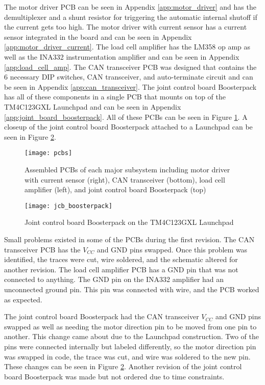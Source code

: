\noindent The motor driver PCB can be seen in Appendix \ref{app:motor_driver} and has the demultiplexer and a shunt resistor for triggering the automatic internal shutoff if the current gets too high. The motor driver with current sensor has a current sensor integrated in the board and can be seen in Appendix \ref{app:motor_driver_current}. The load cell amplifier has the LM358 op amp as well as the INA332 instrumentation amplifier and can be seen in Appendix \ref{app:load_cell_amp}. The CAN transceiver PCB was designed that contains the 6 necessary DIP switches, CAN transceiver, and auto-terminate circuit and can be seen in Appendix \ref{app:can_transceiver}. The joint control board Boosterpack has all of these components in a single PCB that mounts on top of the TM4C123GXL Launchpad and can be seen in Appendix \ref{app:joint_board_boosterpack}. All of these PCBs can be seen in Figure \ref{fig:pcbs}. A closeup of the joint control board Boosterpack attached to a Launchpad can be seen in Figure \ref{fig:jcb_boosterpack}.

\begin{figure}[H]
	\centering
	\texttt{[image: pcbs]}
	\caption{Assembled PCBs of each major subsystem including motor driver with current sensor (right), CAN transceiver (bottom), load cell amplifier (left), and joint control board Boosterpack (top)}
	\label{fig:pcbs}
\end{figure}

\begin{figure}[H]
\centering
\texttt{[image: jcb\_boosterpack]}
\caption{Joint control board Boosterpack on the TM4C123GXL Launchpad}
\label{fig:jcb_boosterpack}
\end{figure}

\noindent Small problems existed in some of the PCBs during the first revision. The CAN transceiver PCB has the $V_{CC}$ and GND pins swapped. Once this problem was identified, the traces were cut, wire soldered, and the schematic altered for another revision. The load cell amplifier PCB has a GND pin that was not connected to anything. The GND pin on the INA332 amplifier had an unconnected ground pin. This pin was connected with wire, and the PCB worked as expected.

\noindent The joint control board Boosterpack had the CAN transceiver $V_{CC}$ and GND pins swapped as well as needing the motor direction pin to be moved from one pin to another. This change came about due to the Launchpad construction. Two of the pins were connected internally but labeled differently, so the motor direction pin was swapped in code, the trace was cut, and wire was soldered to the new pin. These changes can be seen in Figure \ref{fig:jcb_boosterpack}. Another revision of the joint control board Boosterpack was made but not ordered due to time constraints.

